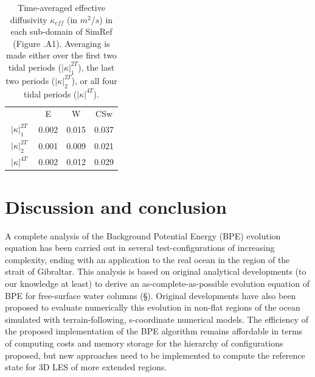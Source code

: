 \begin{table}[h]
    \centering
    \begin{tabular}{|c|c|c|c|}
          \hline
         & E & W & CSw \\
         \cline{2-4}
         $\: |\kappa|^{2T}_1\;$ & 0.002 & 0.015 & 0.037\\
         $\: |\kappa|^{2T}_2 \;$ & 0.001 & 0.009 & 0.021\\
         $\: |\kappa|^{4T} \;$ & 0.002 & 0.012 & 0.029\\
         \hline
    \end{tabular}
    \caption[Time-averaged effective diffusivity $\kappa_{eff}$ in SimRef.]{Time-averaged effective diffusivity $\kappa_{eff}$ (in $m^2/s$) in each sub-domain of SimRef (Figure .A1). Averaging is made either over the first two tidal periods ($|\kappa |^{2T}_1$), the last two periods ($|\kappa |^{2T}_2$), or all four tidal periods ($|\kappa |^{4T}$).}
    \label{tab_kappaTCS}
\end{table}

\section{Discussion and conclusion}
A complete analysis of the Background Potential Energy (BPE) evolution equation has been carried out in several test-configurations of increasing complexity, ending with an application to the real ocean in the region of the strait of Gibraltar. This analysis is based on original analytical developments (to our knowledge at least) to derive an as-complete-as-possible evolution equation of BPE for free-surface water columns (\S {}). Original developments have also been proposed to evaluate numerically this evolution in non-flat regions of the ocean simulated with terrain-following, s-coordinate numerical models. The efficiency of the proposed implementation of the BPE algorithm remains affordable in terms of computing costs and memory storage for the hierarchy of configurations proposed, but new approaches need to be implemented to compute the reference state \citep{saenz_estimating_2015} for 3D LES of more extended regions.

